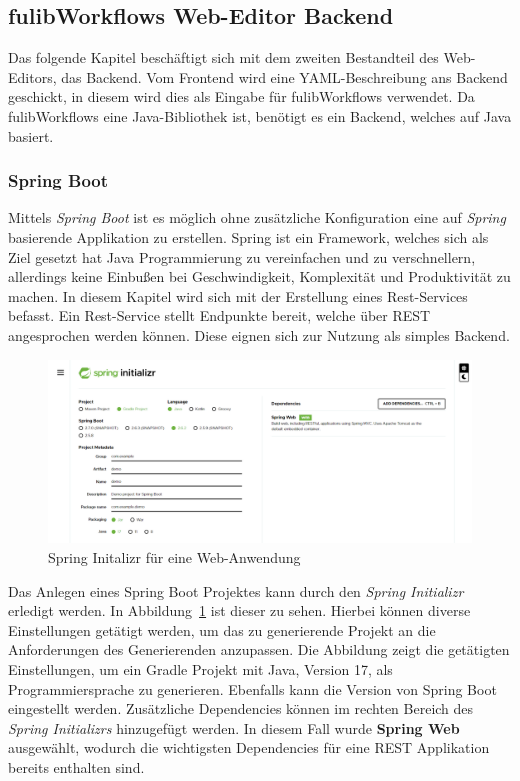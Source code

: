 \subsection{fulibWorkflows Web-Editor Backend}\label{subsec:backend}
Das folgende Kapitel beschäftigt sich mit dem zweiten Bestandteil des Web-Editors, das Backend.
Vom Frontend wird eine YAML-Beschreibung ans Backend geschickt, in diesem wird dies als Eingabe für fulibWorkflows verwendet.
Da fulibWorkflows eine Java-Bibliothek ist, benötigt es ein Backend, welches auf Java basiert.

\subsubsection{Spring Boot}
Mittels \textit{Spring Boot} ist es möglich ohne zusätzliche Konfiguration eine auf \textit{Spring} basierende Applikation zu erstellen.\cite*{springBoot}
Spring ist ein Framework, welches sich als Ziel gesetzt hat Java Programmierung zu vereinfachen und zu verschnellern, allerdings keine Einbußen
bei Geschwindigkeit, Komplexität und Produktivität zu machen.\cite*{spring}
In diesem Kapitel wird sich mit der Erstellung eines Rest-Services befasst.
Ein Rest-Service stellt Endpunkte bereit, welche über REST angesprochen werden können.
Diese eignen sich zur Nutzung als simples Backend.

\begin{figure}[h]
    \centering
    \includegraphics[width=1.0\textwidth]{images/2.2/spring-init}
    \caption{Spring Initalizr für eine Web-Anwendung}
    \label{fig:spring-init}
\end{figure}


Das Anlegen eines Spring Boot Projektes kann durch den \textit{Spring Initializr} erledigt werden.\cite*{sbinit}
In Abbildung~\ref{fig:spring-init} ist dieser zu sehen.
Hierbei können diverse Einstellungen getätigt werden, um das zu generierende Projekt an die Anforderungen des Generierenden anzupassen.
Die Abbildung zeigt die getätigten Einstellungen, um ein Gradle Projekt mit Java, Version 17, als Programmiersprache zu generieren.
Ebenfalls kann die Version von Spring Boot eingestellt werden.
Zusätzliche Dependencies können im rechten Bereich des \textit{Spring Initializrs} hinzugefügt werden.
In diesem Fall wurde \textbf{Spring Web} ausgewählt, wodurch die wichtigsten Dependencies für eine REST Applikation bereits enthalten sind.

